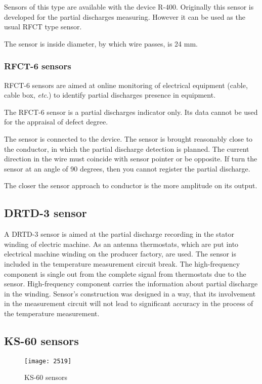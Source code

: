 Sensors of this type are available with the device R-400. Originally this sensor is developed for the partial discharges measuring. However it can be used as the usual RFCT type sensor. 
 
The sensor is inside diameter, by which wire passes, is 24 mm.

\subsubsection{RFCT-6 sensors}
RFCT-6 sensors are aimed at online monitoring of electrical equipment (cable, cable box, \textit{etc}.) to identify partial discharges presence in equipment.

The RFCT-6 sensor is a partial discharges indicator only. Its data cannot be used for the appraisal of defect degree.

The sensor is connected to the device. The sensor is brought reasonably close to the conductor, in which the partial discharge detection is planned. The current direction in the wire must coincide with sensor pointer or be opposite. If turn the sensor at an angle of 90 degrees, then you cannot register the partial discharge.
 
The closer the sensor approach to conductor is the more amplitude on its output.

\subsection{DRTD-3 sensor}
A DRTD-3 sensor is aimed at the partial discharge recording in the stator winding of electric machine. As an antenna thermostats, which are put into electrical machine winding on the producer factory, are used. The sensor is included in the temperature measurement circuit break. The high-frequency component is single out from the complete signal from thermostats due to the sensor. High-frequency component carries the information about partial discharge in the winding. Sensor’s construction was designed in a way, that its involvement in the measurement circuit will not lead to significant accuracy in the process of the temperature measurement.

\subsection{KS-60 sensors}
\begin{figure}[h!]
\centering
\texttt{[image: 2519]}
\caption{KS-60 sensors}
\label{fig:KS-60 sensors}
\end{figure}

